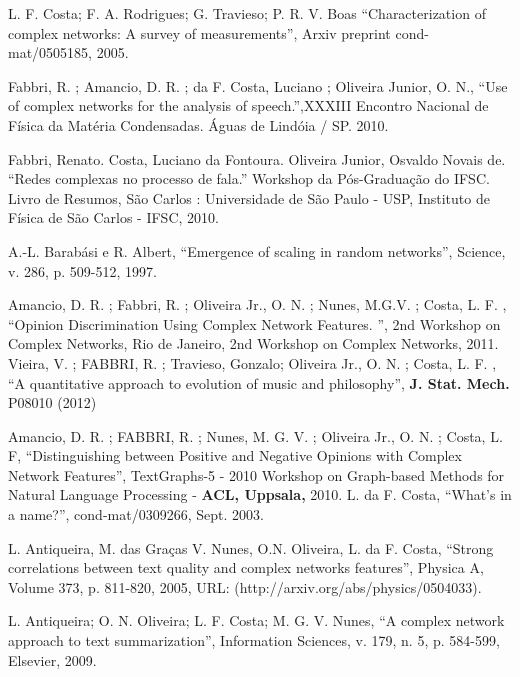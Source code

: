 \documentclass[a4paper,12pt,titlepage]{article}
\begin{document}
\clearpage 
\begin{thebibliography}{1}
 L. F. Costa; F. A. Rodrigues; G. Travieso; P. R. V. Boas ``Characterization of complex networks: A survey of measurements'', Arxiv preprint cond-mat/0505185, 2005.


Fabbri, R. ; Amancio, D. R. ; da F. Costa, Luciano ; Oliveira Junior, O. N., ``Use of complex networks for the analysis of speech.'',XXXIII Encontro Nacional de Física da Matéria Condensadas. Águas de Lindóia / SP. 2010.

 Fabbri, Renato. Costa, Luciano da Fontoura. Oliveira Junior, Osvaldo Novais de. ``Redes complexas no processo de fala.'' Workshop da Pós-Graduação do IFSC. Livro de Resumos, São Carlos : Universidade de São Paulo - USP, Instituto de Física de São Carlos - IFSC, 2010.

 A.-L. Barabási e R. Albert, ``Emergence of scaling in random networks'', Science, v. 286, p. 509-512, 1997.

 Amancio, D. R. ; Fabbri, R. ; Oliveira Jr., O. N. ; Nunes, M.G.V. ; Costa, L. F. , ``Opinion Discrimination Using Complex Network Features. '', 2nd Workshop on Complex Networks, Rio de Janeiro,  2nd Workshop on Complex Networks, 2011.
 Vieira, V. ; FABBRI, R. ; Travieso, Gonzalo; Oliveira Jr., O. N. ; Costa, L. F. , ``A quantitative approach to evolution of
music and philosophy'', {\bf J. Stat. Mech.} P08010 (2012) 

 Amancio, D. R. ; FABBRI, R. ; Nunes, M. G. V. ; Oliveira Jr., O. N. ; Costa, L. F, ``Distinguishing between Positive and Negative Opinions with Complex Network Features'', TextGraphs-5 - 2010 Workshop on Graph-based Methods for Natural Language Processing - {\bf ACL, Uppsala,} 2010.
 L. da F. Costa, ``What's in a name?'', cond-mat/0309266, Sept. 2003.

 L. Antiqueira, M. das Graças V. Nunes, O.N. Oliveira, L. da F. Costa, ``Strong correlations between text quality and complex networks features'', Physica A, Volume 373, p. 811-820, 2005, URL: (http://arxiv.org/abs/physics/0504033).

 L. Antiqueira; O. N. Oliveira; L. F. Costa; M. G. V. Nunes, ``A complex network approach to text summarization'', Information Sciences, v. 179, n. 5, p. 584-599, Elsevier, 2009.


\end{thebibliography}
\end{document}
